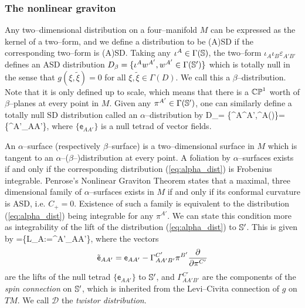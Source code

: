 \subsubsection{The nonlinear graviton}
Any two--dimensional distribution on a four--manifold $M$ can be expressed as the kernel of a two--form, and we define a distribution to be (A)SD if the corresponding two--form is (A)SD. Taking any $\iota^A\in\Gamma(\mathbb{S})$, the two--form $\iota_A\iota_B\varepsilon_{A'B'}$ defines an ASD distribution $D_\beta=\{\iota^Aw^{A'},w^{A'}\in\Gamma(\mathbb{S}')\}$ which is totally null in the sense that $g(\xi,\tilde{\xi})=0$ for all $\xi,\tilde{\xi}\in\Gamma(D)$. We call this a $\beta$--distribution. Note that it is only defined up to scale, which means that there is a $\mathbb{CP}^1$ worth of $\beta$--planes at every point in $M$. Given any $\pi^{A'}\in\Gamma(\mathbb{S}')$, one can similarly define a totally null SD distribution called an $\alpha$--distribution by
\be \label{eq:alpha_dist}
D_\alpha = \{\iota^A\pi^{A'},\iota^{A}\in\Gamma(\spp)\}=\{\pi^{A'}_{AA'}\},
\ee
where $\{\mathsf{e}_{AA'}\}$ is a null tetrad of vector fields.

An $\alpha$--surface (respectively $\beta$--surface) is a two--dimensional surface in $M$ which is tangent to an $\alpha$--($\beta$--)distribution at every point. A foliation by $\alpha$--surfaces exists if and only if the corresponding distribution (\ref{eq:alpha_dist}) is Frobenius integrable. Penrose's Nonlinear Graviton Theorem \cite{penrose} states that a 
maximal, three dimensional family of $\alpha$--surfaces exists in $M$ if and only if its conformal curvature is ASD, i.e. $C_+=0$. Existence of such a family is equivalent to the distribution (\ref{eq:alpha_dist}) being integrable for any $\pi^{A'}$. We can state this condition more as integrability of the lift of the distribution (\ref{eq:alpha_dist}) to $\mathbb{S}'$. This is given by
\be \label{eq:twistor_dist}
=\{L_A:=\pi^{A'}_{AA'}\},
\ee
where the vectors
\[
\tilde{\mathsf{e}}_{AA'}=\mathsf{e}_{AA'} - \Gamma^{C'}_{AA'B'}\pi^{B'}\frac{\partial}{\partial\pi^{C'}}
\]
are the lifts of the null tetrad $\{\mathsf{e}_{AA'}\}$ to $\mathbb{S}'$, and $\Gamma^{C'}_{AA'B'}$ are the components of the \textit{spin connection} on $\mathbb{S}'$, which is inherited from the Levi--Civita connection of $g$ on $TM$. We call $\mathcal{D}$ the \textit{twistor distribution}.

